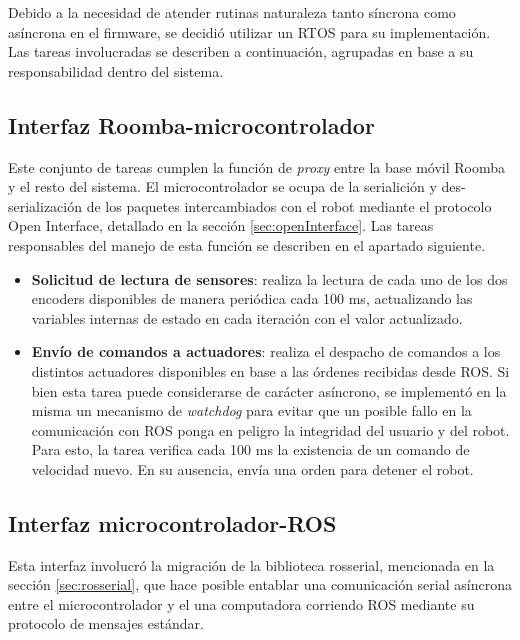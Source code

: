 Debido a la necesidad de atender rutinas naturaleza tanto síncrona como asíncrona en el firmware, se decidió utilizar un RTOS para su implementación. Las tareas involucradas se describen a continuación, agrupadas en base a su responsabilidad dentro del sistema.

\subsection{Interfaz Roomba-microcontrolador}

Este conjunto de tareas cumplen la función de \textit{proxy} entre la base móvil Roomba y el resto del sistema. El microcontrolador se ocupa de la serialición y des-serialización de los paquetes intercambiados con el robot mediante el protocolo Open Interface, detallado en la sección \ref{sec:openInterface}. Las tareas responsables del manejo de esta función se describen en el apartado siguiente.

\begin{itemize}
  \item \textbf{Solicitud de lectura de sensores}: realiza la lectura de cada uno de los dos encoders disponibles de manera periódica cada 100 ms, actualizando las variables internas de estado en cada iteración con el valor actualizado.
  \item \textbf{Envío de comandos a actuadores}: realiza el despacho de comandos a los distintos actuadores disponibles en base a las órdenes recibidas desde ROS. Si bien esta tarea puede considerarse de carácter asíncrono, se implementó en la misma un mecanismo de \textit{watchdog} para evitar que un posible fallo en la comunicación con ROS ponga en peligro la integridad del usuario y del robot. Para esto, la tarea verifica cada 100 ms la existencia de un comando de velocidad nuevo. En su ausencia, envía una orden para detener el robot.
\end{itemize}

\subsection{Interfaz microcontrolador-ROS}

Esta interfaz involucró la migración de la biblioteca rosserial, mencionada en la sección \ref{sec:rosserial}, que hace posible entablar una comunicación serial asíncrona entre el microcontrolador y el una computadora corriendo ROS mediante su protocolo de mensajes estándar.

